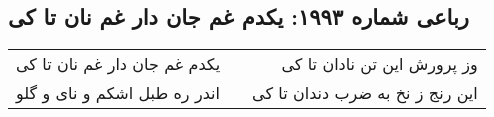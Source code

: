 \begin{center}
\section*{رباعی شماره ۱۹۹۳: یکدم غم جان دار غم نان تا کی}
\label{sec:1993}
\begin{longtable}{l p{0.5cm} r}
یکدم غم جان دار غم نان تا کی
&&
وز پرورش این تن نادان تا کی
\\
اندر ره طبل اشکم و نای و گلو
&&
این رنج ز نخ به ضرب دندان تا کی
\\
\end{longtable}
\end{center}
